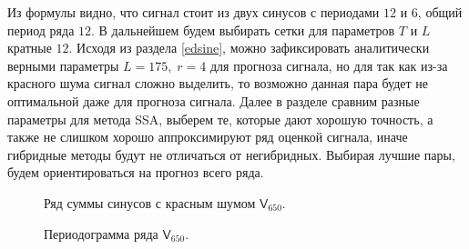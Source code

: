 \documentclass[specialist,
               substylefile = spbu.rtx,
               subf,href,colorlinks=true, 12p]{disser}
\begin{document}
Из формулы видно, что сигнал стоит из двух синусов с периодами $12$ и $6$, общий период  ряда $12$. В дальнейшем будем выбирать сетки для параметров $T$ и $L$ кратные $12$. Исходя из раздела \ref{edsine}, можно зафиксировать аналитически верными параметры $L = 175, \; r = 4$ для прогноза сигнала, но для так как из-за красного шума сигнал сложно выделить, то возможно данная пара будет не оптимальной даже для прогноза сигнала. Далее в разделе сравним разные параметры для метода SSA, выберем те, которые дают хорошую точность, а также не слишком хорошо аппроксимируют ряд оценкой сигнала, иначе гибридные методы будут не отличаться от негибридных. Выбирая лучшие пары, будем ориентироваться на прогноз всего ряда.

\begin{figure}[H]
	\caption{Ряд суммы синусов с красным шумом $\mathsf{V}_{650}$.}
	\label{ser_graph}
\end{figure}

\begin{figure}[H]
	\caption{Периодограмма ряда $\mathsf{V}_{650}$.}
	\label{ser_pgram}
\end{figure}
\end{document}

